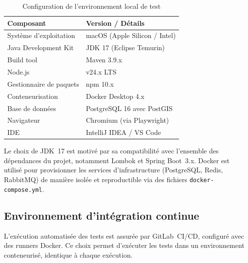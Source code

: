 \begin{table}[H]
\centering
\caption{Configuration de l'environnement local de test}
\label{tab:env-local}
\begin{tabularx}{\textwidth}{|l|X|}
\hline
\rowcolor{speedlineBlue!10}
\textbf{Composant} & \textbf{Version / D\'{e}tails} \\
\hline
Syst\`{e}me d'exploitation & macOS (Apple Silicon / Intel) \\
\hline
Java Development Kit & JDK 17 (Eclipse Temurin) \\
\hline
Build tool & Maven 3.9.x \\
\hline
Node.js & v24.x LTS \\
\hline
Gestionnaire de paquets & npm 10.x \\
\hline
Conteneurisation & Docker Desktop 4.x \\
\hline
Base de donn\'{e}es & PostgreSQL 16 avec PostGIS \\
\hline
Navigateur & Chromium (via Playwright) \\
\hline
IDE & IntelliJ IDEA / VS Code \\
\hline
\end{tabularx}
\end{table}

Le choix de JDK~17 est motiv\'{e} par sa compatibilit\'{e} avec l'ensemble des
d\'{e}pendances du projet, notamment Lombok et Spring Boot~3.x. Docker est
utilis\'{e} pour provisionner les services d'infrastructure (PostgreSQL,
Redis, RabbitMQ) de mani\`{e}re isol\'{e}e et reproductible via des fichiers
\texttt{docker-compose.yml}.

\subsection{Environnement d'int\'{e}gration continue}

L'ex\'{e}cution automatis\'{e}e des tests est assur\'{e}e par GitLab~CI/CD,
configur\'{e} avec des runners Docker. Ce choix permet d'ex\'{e}cuter les tests
dans un environnement conteneuris\'{e}, identique \`{a} chaque ex\'{e}cution.

